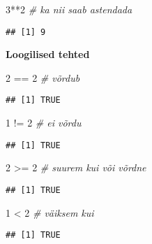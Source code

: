 \documentclass[
]{book}
\newenvironment{Shaded}{\begin{snugshade}}{\end{snugshade}}
\newcommand{\CommentTok}[1]{\textcolor[rgb]{0.56,0.35,0.01}{\textit{#1}}}
\newcommand{\DecValTok}[1]{\textcolor[rgb]{0.00,0.00,0.81}{#1}}
\newcommand{\SpecialCharTok}[1]{\textcolor[rgb]{0.00,0.00,0.00}{#1}}
\begin{document}
\begin{Shaded}
\begin{Highlighting}[]
\DecValTok{3}\SpecialCharTok{**}\DecValTok{2} \CommentTok{\# ka nii saab astendada}
\end{Highlighting}
\end{Shaded}

\begin{verbatim}
## [1] 9
\end{verbatim}

\textbf{Loogilised tehted}

\begin{Shaded}
\begin{Highlighting}[]
\DecValTok{2} \SpecialCharTok{==} \DecValTok{2} \CommentTok{\# võrdub}
\end{Highlighting}
\end{Shaded}

\begin{verbatim}
## [1] TRUE
\end{verbatim}

\begin{Shaded}
\begin{Highlighting}[]
\DecValTok{1} \SpecialCharTok{!=} \DecValTok{2} \CommentTok{\# ei võrdu}
\end{Highlighting}
\end{Shaded}

\begin{verbatim}
## [1] TRUE
\end{verbatim}

\begin{Shaded}
\begin{Highlighting}[]
\DecValTok{2} \SpecialCharTok{\textgreater{}=} \DecValTok{2} \CommentTok{\# suurem kui või võrdne}
\end{Highlighting}
\end{Shaded}

\begin{verbatim}
## [1] TRUE
\end{verbatim}

\begin{Shaded}
\begin{Highlighting}[]
\DecValTok{1} \SpecialCharTok{\textless{}} \DecValTok{2}  \CommentTok{\# väiksem kui}
\end{Highlighting}
\end{Shaded}

\begin{verbatim}
## [1] TRUE
\end{verbatim}
\end{document}
